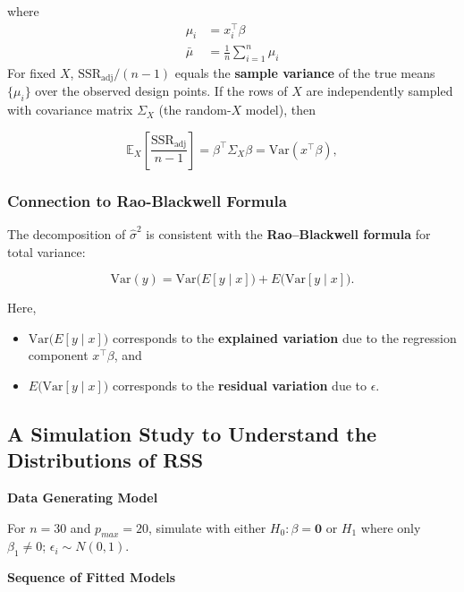 \documentclass[
  letterpaper,
  DIV=11,
  numbers=noendperiod]{scrreprt}
\providecommand{\tightlist}{%
  \setlength{\itemsep}{0pt}\setlength{\parskip}{0pt}}\usepackage{longtable,booktabs,array}
\begin{document}
where \[
\begin{aligned}
\mu_i &= x_i^\top \beta \\
\bar\mu &= \tfrac{1}{n}\sum_{i=1}^n \mu_i
\end{aligned}
\] For fixed \(X\), \(\mathrm{SSR}_{\text{adj}}/(n-1)\) equals the
\textbf{sample variance} of the true means \(\{\mu_i\}\) over the
observed design points. If the rows of \(X\) are independently sampled
with covariance matrix \(\Sigma_X\) (the random-\(X\) model), then

\[
\mathbb{E}_X\!\left[\frac{\mathrm{SSR}_{\text{adj}}}{n-1}\right]
= \beta^\top \Sigma_X \beta
= \mathrm{Var}(x^\top \beta),
\]

\subsubsection{Connection to Rao-Blackwell
Formula}\label{connection-to-rao-blackwell-formula}

The decomposition of \(\hat{\sigma}^2\) is consistent with the
\textbf{Rao--Blackwell formula} for total variance:

\[
\mathrm{Var}(y) = \mathrm{Var}\!\big(E[y \mid x]\big) + E\!\big(\mathrm{Var}[y \mid x]\big).
\]

Here,

\begin{itemize}
\tightlist
\item
  \(\mathrm{Var}\!\big(E[y \mid x]\big)\) corresponds to the
  \textbf{explained variation} due to the regression component
  \(x^\top\beta\), and\\
\item
  \(E\!\big(\mathrm{Var}[y \mid x]\big)\) corresponds to the
  \textbf{residual variation} due to \(\epsilon\).
\end{itemize}

\subsection{A Simulation Study to Understand the Distributions of
RSS}\label{a-simulation-study-to-understand-the-distributions-of-rss}

\textbf{Data Generating Model}

For \(n=30\) and \(p_{max}=20\), simulate with either
\(H_0:\beta=\mathbf 0\) or \(H_1\) where only \(\beta_1\neq 0\);
\(\epsilon_i\sim N(0,1)\).

\textbf{Sequence of Fitted Models}
\end{document}

